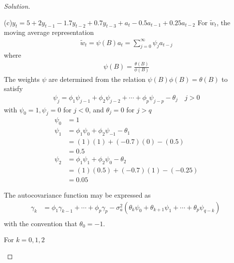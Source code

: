 \documentclass[UTF8,a4paper,14pt]{ctexart}
\newenvironment{solution}
  {\renewcommand\qedsymbol{$\blacksquare$}\begin{proof}[Solution]}
  {\end{proof}}
\theoremstyle{definition}
\theoremstyle{remark}
\begin{document}
\begin{solution}
\begin{mybox}{(c)\(y_t = 5+2y_{t-1}-1.7y_{t-2}+0.7y_{t-3}+a_t-0.5 a_{t-1}+0.25 a_{t-2}\)}
    For \(\tilde{w}_t\), the moving average representation
    \begin{equation}\
      \begin{aligned}
        \tilde{w}_t = \psi(B)a_t =\sum_{j = 0}^{\infty} \psi_j a_{t-j} 
      \end{aligned}
    \end{equation}
    where
      \begin{equation}\
        \begin{aligned}
        \psi(B) = \frac{\theta(B)}{\phi(B)}
        \end{aligned}
      \end{equation}
      The weights \(\psi\) are determined from the relation \(\psi(B) \phi(B)= \theta(B)\) to satisfy
      \begin{equation}\
        \begin{aligned}
        \psi_j = \phi_1\psi_{j-1}+\phi_2\psi_{j-2}+\cdots+\phi_p\psi_{j-p}-\theta_j\quad j>0
        \end{aligned}
      \end{equation}
      with \(\psi_0 = 1, \psi_j = 0\) for \(j<0\), and \(\theta_j = 0\) for \(j>q\)
      \begin{equation*}\
        \begin{aligned}
        \psi_0 &= 1\\
        \psi_1 &= \phi_1\psi_0+\phi_2\psi_{-1}-\theta_1\\
        &=(1)(1)+(-0.7)(0)-(0.5)\\
        &=0.5\\
        \psi_2 &= \phi_1\psi_1+\phi_2\psi_{0}-\theta_2\\
        &=(1)(0.5)+(-0.7)(1)-(-0.25)\\
        &=0.05
      \end{aligned}
      \end{equation*}

      The autocovariance function may be expressed as
      \begin{equation}
        \begin{aligned}\label{eq:3.4.2}
          \gamma_k &= \phi_1\gamma_{k-1}+\cdots+\phi_p\gamma_p-\sigma_a^2(\theta_k\psi_0+\theta_{k+1}\psi_1+\cdots+\theta_p\psi_{q-k})\\
        \end{aligned}
      \end{equation}
      with the convention that \(\theta_0 = -1\).

      For \(k = 0,1,2\)


\end{mybox}
\end{solution}
\end{document}
